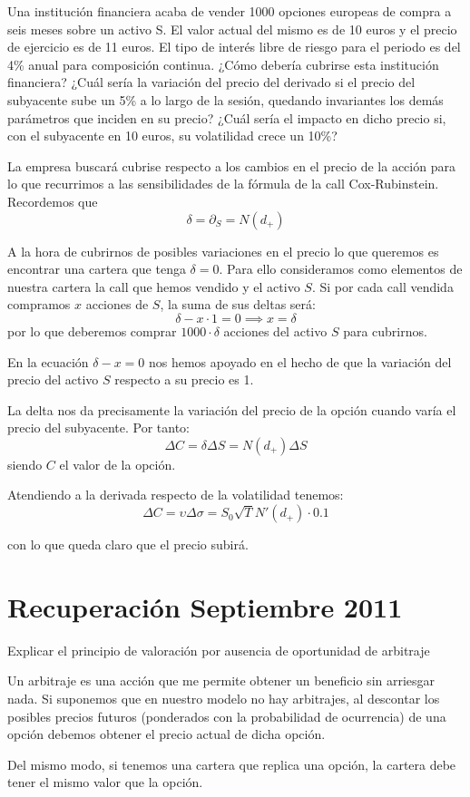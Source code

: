 \begin{problem}[4]
Una institución financiera acaba de vender 1000 opciones europeas de compra a seis meses sobre
un activo S. El valor actual del mismo es de 10 euros y el precio de ejercicio es de 11 euros. El tipo
de interés libre de riesgo para el periodo es del 4\% anual para composición continua.
\ppart ¿Cómo debería cubrirse esta institución financiera?
\ppart ¿Cuál sería la variación del precio del derivado si el precio del subyacente sube un 5\% a lo largo de la sesión, quedando invariantes los demás parámetros que inciden en su precio?
\ppart ¿Cuál sería el impacto en dicho precio si, con el subyacente en 10 euros, su volatilidad crece un 10\%?

\solution
{}

\spart

La empresa buscará cubrise respecto a los cambios en el precio de la acción para lo que recurrimos a las sensibilidades de la fórmula de la call Cox-Rubinstein. Recordemos que
\[δ = \partial_S = N(d_+)\]

A la hora de cubrirnos de posibles variaciones en el precio lo que queremos es encontrar una cartera que tenga $δ=0$. Para ello consideramos como elementos de nuestra cartera la call que hemos vendido y el activo $S$. Si por cada call vendida compramos $x$ acciones de $S$, la suma de sus deltas será:
\[δ - x\cdot 1 = 0 \implies x = δ\]
por lo que deberemos comprar $1000\cdot δ$ acciones del activo $S$ para cubrirnos.

\obs En la ecuación $δ-x=0$ nos hemos apoyado en el hecho de que la variación del precio del activo $S$ respecto a su precio es 1.

\spart

La delta nos da precisamente la variación del precio de la opción cuando varía el precio del subyacente. Por tanto:
\[ΔC = δΔS = N(d_+)ΔS \]
siendo $C$ el valor de la opción.

\spart

Atendiendo a la derivada respecto de la volatilidad tenemos:
\[ΔC = \upsilon Δσ = S_0\sqrt{T}N'(d_+)\cdot 0.1\]

con lo que queda claro que el precio subirá.

\end{problem}

\section{Recuperación Septiembre 2011}
\begin{problem}[1]
Explicar el principio de valoración por ausencia de oportunidad de arbitraje
\solution


Un arbitraje es una acción que me permite obtener un beneficio sin arriesgar nada. Si suponemos que en nuestro modelo no hay arbitrajes, al descontar los posibles precios futuros (ponderados con la probabilidad de ocurrencia) de una opción debemos obtener el precio actual de dicha opción.

Del mismo modo, si tenemos una cartera que replica una opción, la cartera debe tener el mismo valor que la opción.
\end{problem}

